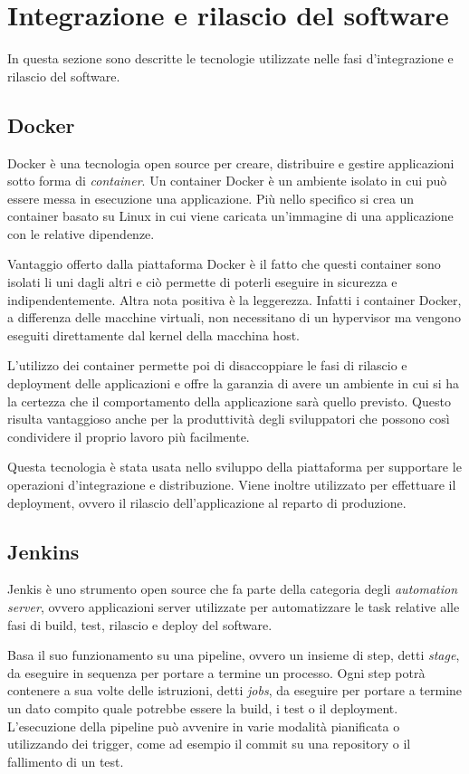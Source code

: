 \section{Integrazione e rilascio del software}
In questa sezione sono descritte le tecnologie utilizzate nelle fasi d'integrazione e rilascio del software.

\subsection{Docker}
Docker \cite{Docker} è una tecnologia open source per creare, distribuire e gestire applicazioni sotto forma di \textit{container}.
Un container Docker è un ambiente isolato in cui può essere messa in esecuzione una applicazione.
Più nello specifico si crea un container basato su Linux in cui viene caricata un'immagine di una applicazione con le relative dipendenze.

Vantaggio offerto dalla piattaforma Docker è il fatto che questi container sono isolati li uni dagli altri
e ciò permette di poterli eseguire in sicurezza e indipendentemente.
Altra nota positiva è la leggerezza. Infatti i container Docker, a differenza delle macchine virtuali, non necessitano
di un hypervisor ma vengono eseguiti direttamente dal kernel della macchina host.

L'utilizzo dei container permette poi di disaccoppiare le fasi di rilascio e deployment delle applicazioni e offre la garanzia
di avere un ambiente in cui si ha la certezza che il comportamento della applicazione sarà quello previsto. Questo risulta
vantaggioso anche per la produttività degli sviluppatori che possono così condividere
il proprio lavoro più facilmente.

Questa tecnologia è stata usata nello sviluppo della piattaforma per supportare le operazioni d'integrazione e distribuzione.
Viene inoltre utilizzato per effettuare il deployment, ovvero il rilascio dell'applicazione al reparto di produzione.

\subsection{Jenkins}
Jenkis \cite{Jenkins} è uno strumento open source che fa parte della categoria degli \textit{automation server}, ovvero applicazioni server utilizzate
per automatizzare le task relative alle fasi di build, test, rilascio e deploy del software.

Basa il suo funzionamento su una pipeline, ovvero un insieme di step, detti \textit{stage}, da eseguire in sequenza per portare a termine un processo.
Ogni step potrà contenere a sua volte delle istruzioni, detti \textit{jobs}, da eseguire per portare a termine un dato compito quale potrebbe essere la build, i test o il deployment.
L'esecuzione della pipeline può avvenire in varie modalità pianificata o utilizzando dei trigger, come ad esempio il commit su una repository o il fallimento di un test.
